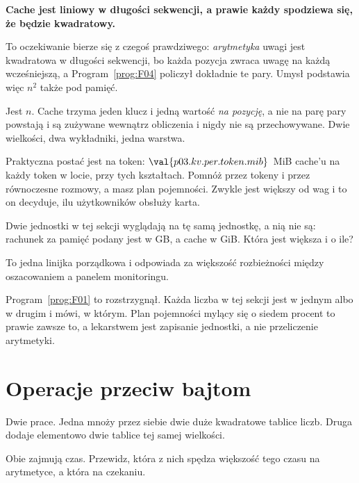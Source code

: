 \begin{fr}
\begin{trapbox}
\textbf{Cache jest liniowy w długości sekwencji, a prawie każdy spodziewa się,
że będzie kwadratowy.}

To oczekiwanie bierze się z czegoś prawdziwego: \emph{arytmetyka} uwagi jest
kwadratowa w długości sekwencji, bo każda pozycja zwraca uwagę na każdą
wcześniejszą, a Program~\ref{prog:F04} policzył dokładnie te pary. Umysł
podstawia więc $n^{2}$ także pod pamięć.

Jest $n$. Cache trzyma jeden klucz i jedną wartość \emph{na pozycję}, a nie na
parę \dash{} pary powstają i są zużywane wewnątrz obliczenia i nigdy nie są
przechowywane. Dwie wielkości, dwa wykładniki, jedna warstwa.

Praktyczna postać jest na token: $\val{p03.kv.per.token.mib}$~MiB cache'u na
każdy token w locie, przy tych kształtach. Pomnóż przez tokeny i przez
równoczesne rozmowy, a masz plan pojemności. Zwykle jest większy od wag i to on
decyduje, ilu użytkowników obsłuży karta.
\end{trapbox}

Dwie jednostki w tej sekcji wyglądają na tę samą jednostkę, a nią nie są:
rachunek za pamięć podany jest w GB, a cache w GiB. Która jest większa i o
ile?
\dotline
\nextframe
\end{fr}

\begin{fr}

To jedna linijka porządkowa i odpowiada za większość rozbieżności między
oszacowaniem a panelem monitoringu.

Program~\ref{prog:F01} to rozstrzygnął. Każda liczba w tej
sekcji jest w jednym albo w drugim i mówi, w którym. Plan pojemności mylący się
o siedem procent to prawie zawsze to, a lekarstwem jest zapisanie jednostki, a
nie przeliczenie arytmetyki.
\end{fr}

\section{Operacje przeciw bajtom}
\label{sec:P03-intensity}

\begin{fr}
Dwie prace. Jedna mnoży przez siebie dwie duże kwadratowe tablice liczb. Druga
dodaje elementowo dwie tablice tej samej wielkości.

Obie zajmują czas. Przewidz, która z nich spędza większość tego czasu na
arytmetyce, a która na czekaniu.
\nextframe
\end{fr}

